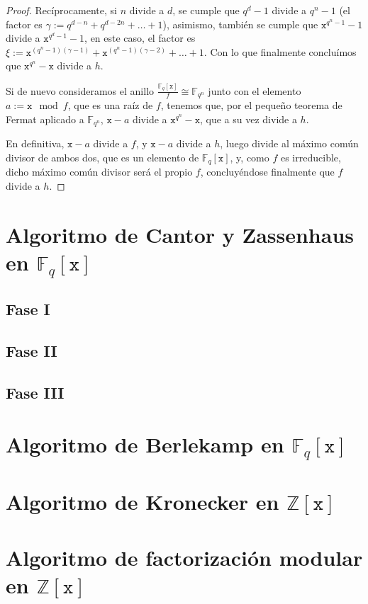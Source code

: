 \documentclass[a4paper, 11pt, twoside, notitlepage, openany, onecolumn, final]{report}
\begin{document}
\begin{proof}
	Recíprocamente, si $n$ divide a $d$, se cumple que $q^d-1$ divide a $q^n-1$ (el factor es $\gamma:=q^{d-n}+q^{d-2n}+\dots+1$), asimismo, también se cumple que $\texttt{x}^{q^n-1}-1$ divide a $\texttt{x}^{q^d-1}-1$, en este caso, el factor es $\xi:=\texttt{x}^{(q^n-1)(\gamma-1)}+\texttt{x}^{(q^n-1)(\gamma-2)}+\dots+1$. Con lo que finalmente concluímos que $\texttt{x}^{q^n}-\texttt{x}$ divide a $h$.
	
	Si de nuevo consideramos el anillo $\frac{\mathbb{F}_q[\texttt{x}]}{f}\cong \mathbb{F}_{q^n}$ junto con el elemento $a:=\texttt{x}\mod f$, que es una raíz de $f$, tenemos que, por el pequeño teorema de Fermat aplicado a $\mathbb{F}_{q^n}$, $\texttt{x}-a$ divide a $\texttt{x}^{q^n}-\texttt{x}$, que a su vez divide a $h$.
	
	En definitiva, $\texttt{x}-a$ divide a $f$, y $\texttt{x}-a$ divide a $h$, luego divide al máximo común divisor de ambos dos, que es un elemento de $\mathbb{F}_q[\texttt{x}]$, y, como $f$ es irreducible, dicho máximo común divisor será el propio $f$, concluyéndose finalmente que $f$ divide a $h$.
	\end{proof}
	\section{Algoritmo de Cantor y Zassenhaus en $\mathbb{F}_q[\texttt{x}]$}
	\subsection{Fase I}
	\subsection{Fase II}
	\subsection{Fase III}
	\section{Algoritmo de Berlekamp en $\mathbb{F}_q[\texttt{x}]$}
	\section{Algoritmo de Kronecker en $\mathbb{Z}[\texttt{x}]$}
	\section{Algoritmo de factorización modular en $\mathbb{Z}[\texttt{x}]$}
\end{document}
